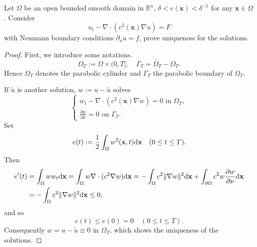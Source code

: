 \begin{pro}
  Let $\Omega$ be an open bounded smooth domain in $\mathbb{R}^n$,
  $\delta<c(\mathbf{x})<\delta^{-1}$ for any $\mathbf{x}\in\Omega$.
  Consider
  \begin{equation}
    \label{eq:8}
    u_t - \nabla\cdot(c^2(\mathbf{x})\nabla u) = F
  \end{equation}
  with Neumann boundary conditions $\partial_{\nu}u = f$,
  prove uniqueness for the solutions.
\end{pro}
\begin{proof}
  First,
  we introduce some notations.
  \begin{displaymath}
    \Omega_T := \Omega\times (0, T], \quad \Gamma_T =
    \overline{\Omega}_T - \Omega_T.
  \end{displaymath}
  Hence $\Omega_T$ denotes the parabolic cylinder
  and $\Gamma_T$ the parabolic boundary of $\Omega_T$.
  
  If $\tilde{u}$ is another solution,
  $w := u - \tilde{u}$ solves
  \begin{equation}
    \begin{cases}
      w_t - \nabla\cdot(c^2(\mathbf{x})\nabla w) = 0 \text{ in } \Omega_T, \\
      \frac{\partial w}{\partial \nu} = 0 \text{ on } \Gamma_T.
    \end{cases}
  \end{equation}
  Set
  \begin{displaymath}
    e(t) := \frac{1}{2}\int_{\Omega}w^2(\mathbf{x}, t)\mathrm{d}\mathbf{x} \quad (0\le t\le T).
  \end{displaymath}
  Then
  \begin{align*}
    e'(t) &= \int_{\Omega}ww_t\mathrm{d}\mathbf{x} =
    \int_{\Omega}w\nabla\cdot(c^2\nabla w)\mathrm{d}\mathbf{x}
    = -\int_{\Omega}c^2\|\nabla w\|^2\mathrm{d}\mathbf{x}
    + \int_{\partial\Omega}c^2w \frac{\partial w}{\partial
            \nu}\mathrm{d}\mathbf{x} \\
    &= -\int_{\Omega}c^2\|\nabla w\|^2\mathrm{d} \mathbf{x}
    \le 0,
  \end{align*}
  and so
  \begin{displaymath}
    e(t) \le e(0) = 0 \quad (0\le t \le T).
  \end{displaymath}
  Consequently $w = u-\tilde{u}\equiv 0$ in $\Omega_T$,
  which shows the uniqueness of the solutions.
\end{proof}

